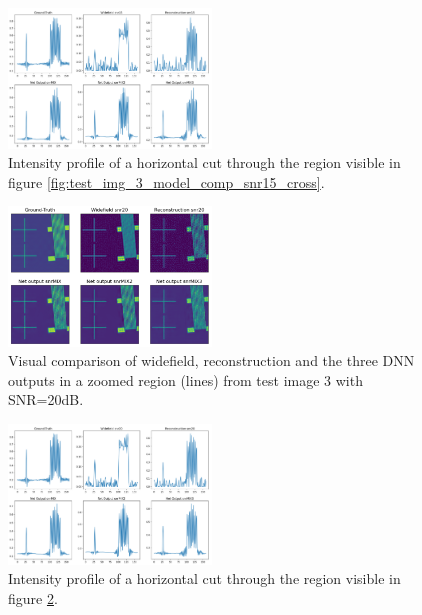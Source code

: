 \documentclass[conference]{IEEEtran}
\begin{document}
\begin{figure}[h!]
    \centering
    \includegraphics[width=0.48\textwidth]{images/test_img_3_model_comp_snr15_cross_cut.png}
    \caption{Intensity profile of a horizontal cut through the region visible in figure \ref{fig:test_img_3_model_comp_snr15_cross}.}
    \label{fig:test_img_3_model_comp_snr15_cross_cut}
\end{figure}
\begin{figure}[h!]
    \centering
    \includegraphics[width=0.48\textwidth]{images/test_img_3_model_comp_snr20_cross.png}
    \caption{Visual comparison of widefield, reconstruction and the three DNN outputs in a zoomed region (lines) from test image 3 with SNR=20dB.}
    \label{fig:test_img_3_model_comp_snr20_cross}
\end{figure}
\begin{figure}[h!]
    \centering
    \includegraphics[width=0.48\textwidth]{images/test_img_3_model_comp_snr20_cross_cut.png}
    \caption{Intensity profile of a horizontal cut through the region visible in figure \ref{fig:test_img_3_model_comp_snr20_cross}.}
    \label{fig:test_img_3_model_comp_snr20_cross_cut}
\end{figure}
\end{document}
